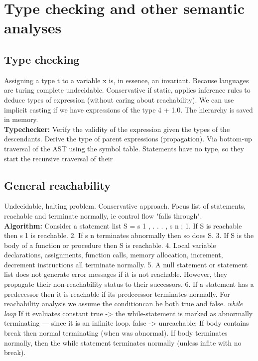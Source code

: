 \section{Type checking and other semantic analyses}
\subsection*{Type checking}
Assigning a type t to a variable x is, in essence, an invariant. Because languages are turing complete undecidable. Conservative if static, applies inference rules to deduce types of expression (without caring about reachability). We can use implicit casting if we have expressions of the type 4 + 1.0. The hierarchy is saved in memory.\\
\textbf{Typechecker:} Verify the validity of the expression given the types of the descendants. Derive the type of parent expressions (propagation). Via bottom-up traversal of the AST using the symbol table. Statements have no type, so they start the recursive traversal of their
\subsection*{General reachability}
Undecidable, halting problem. Conservative approach. Focus list of statements, reachable and terminate normally, ie control flow "falls through".\\
\textbf{Algorithm:} Consider a statement list S = s 1 , . . . , s n ;
1. If S is reachable then s 1 is reachable. 2. If s n terminates abnormally then so does S. 3. If S is the body of a function or procedure then S is reachable. 4. Local variable declarations, assignments, function calls, memory allocation, increment, decrement instructions all terminate normally. 5. A null statement or statement list does not generate error messages if it is not reachable. However, they propagate their non-reachability status to their successors. 6. If a statement has a predecessor then it is reachable if its predecessor terminates normally. For reachability analysis we assume the conditioncan be both true and false. \textit{while loop} If it evaluates constant true -> the while-statement is marked as abnormally terminating — since it is an infinite loop. false -> unreachable; If body contains break then normal terminating (when was abnormal). If body terminates normally, then the while statement terminates normally (unless infite with no break).
